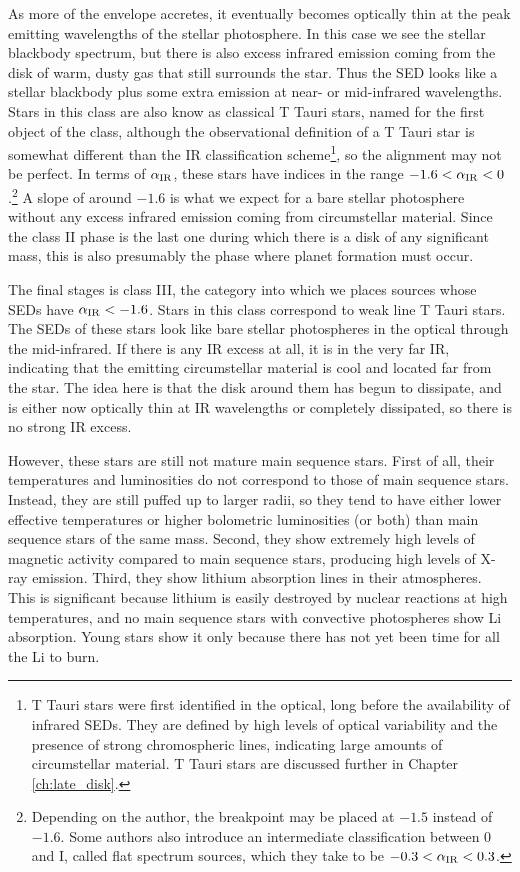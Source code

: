 As more of the envelope accretes, it eventually becomes optically thin at the peak emitting wavelengths of the stellar photosphere. In this case we see the stellar blackbody spectrum, but there is also excess infrared emission coming from the disk of warm, dusty gas that still surrounds the star. Thus the SED looks like a stellar blackbody plus some extra emission at near- or mid-infrared wavelengths. Stars in this class are also know as classical T Tauri stars, named for the first object of the class, although the observational definition of a T Tauri star is somewhat different than the IR classification scheme\footnote{T Tauri stars were first identified in the optical, long before the availability of infrared SEDs. They are defined by high levels of optical variability and the presence of strong chromospheric lines, indicating large amounts of circumstellar material. T Tauri stars are discussed further in Chapter \ref{ch:late_disk}.}, so the alignment may not be perfect. In terms of $\alpha_{\rm IR}$, these stars have indices in the range $-1.6 < \alpha_{\rm IR} < 0$.\footnote{Depending on the author, the breakpoint may  be placed at $-1.5$ instead of $-1.6$. Some authors also introduce an intermediate classification between 0 and I, called flat spectrum sources, which they take to be $-0.3 < \alpha_{\rm IR} < 0.3$.} A slope of around $-1.6$ is what we expect for a bare stellar photosphere without any excess infrared emission coming from circumstellar material. Since the class II phase is the last one during which there is a disk of any significant mass, this is also presumably the phase where planet formation must occur.

The final stages is class III, the category into which we places sources whose SEDs have $\alpha_{\rm IR} < -1.6$. Stars in this class correspond to weak line T Tauri stars. The SEDs of these stars look like bare stellar photospheres in the optical through the mid-infrared. If there is any IR excess at all, it is in the very far IR, indicating that the emitting circumstellar material is cool and located far from the star. The idea here is that the disk around them has begun to dissipate, and is either now optically thin at IR wavelengths or completely dissipated, so there is no strong IR excess. 

However, these stars are still not mature main sequence stars. First of all, their temperatures and luminosities do not correspond to those of main sequence stars. Instead, they are still puffed up to larger radii, so they tend to have either lower effective temperatures or higher bolometric luminosities (or both) than main sequence stars of the same mass. Second, they show extremely high levels of magnetic activity compared to main sequence stars, producing high levels of X-ray emission. Third, they show lithium absorption lines in their atmospheres. This is significant because lithium is easily destroyed by nuclear reactions at high temperatures, and no main sequence stars with convective photospheres show Li absorption. Young stars show it only because there has not yet been time for all the Li to burn.

